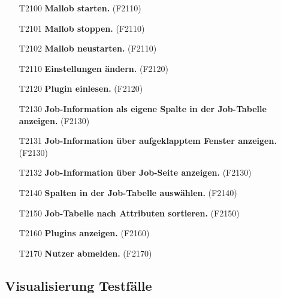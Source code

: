 \begin{itemize}
    \item[T2100] \textbf{Mallob starten.} (F2110)
    
    \item[T2101] \textbf{Mallob stoppen.} (F2110)
    
    \item[T2102] \textbf{Mallob neustarten.} (F2110)
    
    \item[T2110] \textbf{Einstellungen ändern.} (F2120)
    
    \item[T2120] \textbf{Plugin einlesen.} (F2120)
    
    \item[T2130] \textbf{Job-Information als eigene Spalte in der Job-Tabelle anzeigen.} (F2130)
    
    \item[T2131] \textbf{Job-Information über aufgeklapptem Fenster anzeigen.} (F2130)
    
    \item[T2132] \textbf{Job-Information über Job-Seite anzeigen.} (F2130)
    
    \item[T2140] \textbf{Spalten in der Job-Tabelle auswählen.} (F2140)
    
    \item[T2150] \textbf{Job-Tabelle nach Attributen sortieren.} (F2150)
    
    \item[T2160] \textbf{Plugins anzeigen.} (F2160)
    
    \item[T2170] \textbf{Nutzer abmelden.} (F2170)
    
\end{itemize}

\subsection{Visualisierung Testfälle}

